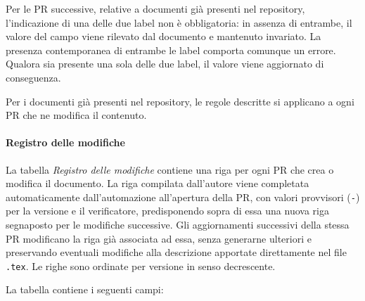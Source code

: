 \documentclass[11pt, a4paper]{article}
\begin{document}
\begin{itemize}
    Per le PR successive, relative a documenti già presenti nel repository, l'indicazione di una delle due label non è obbligatoria: in assenza di entrambe, il valore del campo viene rilevato dal documento e mantenuto invariato. La presenza contemporanea di entrambe le label comporta comunque un errore. Qualora sia presente una sola delle due label, il valore viene aggiornato di conseguenza.
\end{itemize}

Per i documenti già presenti nel repository, le regole descritte si applicano a ogni PR che ne modifica il contenuto.

\paragraph{Registro delle modifiche}

La tabella \textit{Registro delle modifiche} contiene una riga per ogni PR che crea o modifica il documento. La riga compilata dall'autore viene completata automaticamente dall'automazione all'apertura della PR, con valori provvisori (\texttt{-}) per la versione e il verificatore, predisponendo sopra di essa una nuova riga segnaposto per le modifiche successive. Gli aggiornamenti successivi della stessa PR modificano la riga già associata ad essa, senza generarne ulteriori e preservando eventuali modifiche alla descrizione apportate direttamente nel file \texttt{.tex}. Le righe sono ordinate per versione in senso decrescente.

La tabella contiene i seguenti campi:
\end{document}
